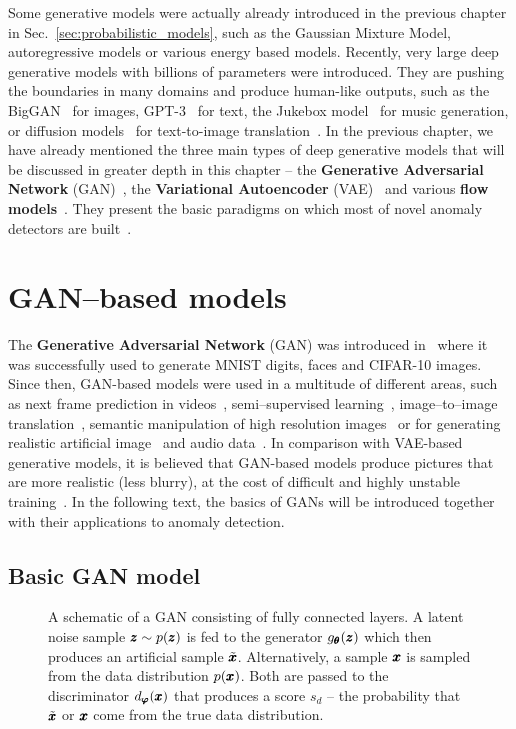 Some generative models were actually already introduced in the previous chapter in Sec.~\ref{sec:probabilistic_models}, such as the Gaussian Mixture Model, autoregressive models or various energy based models. Recently, very large deep generative models with billions of parameters were introduced. They are pushing the boundaries in many domains and produce human-like outputs, such as the BigGAN~\cite{brock2018large} for images, GPT-3~\cite{brown2020language} for text, the Jukebox model~\cite{dhariwal2020jukebox} for music generation, or diffusion models~\cite{sohl2015deep} for text-to-image translation~\cite{saharia2022photorealistic}. In the previous chapter, we have already mentioned the three main types of deep generative models that will be discussed in greater depth in this chapter -- the \textbf{Generative Adversarial Network} (GAN)~\cite{goodfellow2014gan}, the \textbf{Variational Autoencoder} (VAE)~\cite{kingma2013vae} and various \textbf{flow models}~\cite{dinh2014nice}. They present the basic paradigms on which most of novel anomaly detectors are built~\cite{an2015variational,xu2018unsupervised,wang2018generative,perera2019ocgan,yamaguchi2019adaflow,schmidtNormalizingFlowsNovelty2019}. 

\section{GAN--based models}
The \textbf{Generative Adversarial Network} (GAN) was introduced in~\cite{goodfellow2014gan} where it was successfully used to generate MNIST digits, faces and CIFAR-10 images. Since then, GAN-based models were used in a multitude of different areas, such as next frame prediction in videos~\cite{lotter2015unsupervised}, semi--supervised learning~\cite{salimans2016fmgan}, image--to--image translation~\cite{zhu2016generative}, semantic manipulation of high resolution images~\cite{wang2018high} or for generating realistic artificial image~\cite{karras2019style} and audio data~\cite{lee2022bigvgan}. In comparison with VAE-based generative models, it is believed that GAN-based models produce pictures that are more realistic (less blurry), at the cost of difficult and highly unstable training~\cite{salimans2016fmgan}. In the following text, the basics of GANs will be introduced together with their applications to anomaly detection. 

\subsection{Basic GAN model}
\begin{figure}
\centering{}\caption{A schematic of a GAN consisting of fully connected layers. A latent
noise sample $\pmb{{z}}\sim p(\pmb{{z}})$ is fed to the generator $g_{\pmb{{\theta}}}(\pmb{{z}})$
which then produces an artificial sample $\tilde{\pmb{{x}}}$. Alternatively,
a sample $\pmb{{x}}$ is sampled from the data distribution $p(\pmb{{x}})$. Both
are passed to the discriminator $d_{\pmb{{\varphi}}}(\pmb{{x}})$ that produces a score
$s_d$ -- the probability that $\tilde{\pmb{{x}}}$ or $\pmb{{x}}$ come from the
true data distribution.}
\label{fig:gan}
\end{figure}

